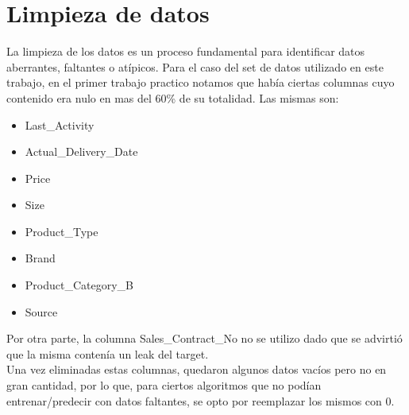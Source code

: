 \documentclass[12pt,a4paper]{article}
\begin{document}
\section{Limpieza de datos}
La limpieza de los datos es un proceso fundamental para identificar datos aberrantes, faltantes o atípicos. Para el caso del set de datos utilizado en este trabajo, en el primer trabajo practico notamos que había ciertas columnas cuyo contenido era nulo en mas del 60\% de su totalidad. Las mismas son:
\begin{itemize}
    \item Last\_Activity
    \item Actual\_Delivery\_Date
    \item Price
    \item Size
    \item Product\_Type
    \item Brand
    \item Product\_Category\_B
    \item Source 
\end{itemize}
Por otra parte, la columna Sales\_Contract\_No no se utilizo dado que se advirtió que la misma contenía un leak del target. \\
Una vez eliminadas estas columnas, quedaron algunos datos vacíos pero no en gran cantidad, por lo que, para ciertos algoritmos que no podían entrenar/predecir con datos faltantes, se opto por reemplazar los mismos con 0.
\end{document}
